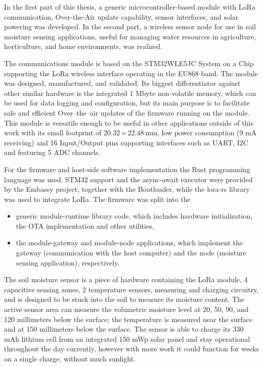 
In the first part of this thesis, a generic microcontroller-based module with LoRa communication, Over-the-Air update capability,  sensor interfaces, and solar powering was developed. In the second part, a wireless sensor node for use in soil moisture sensing applications, useful for managing water resources in agriculture, horticulture, and home environments, was realized.

The communications module is based on the STM32WLE5JC System on a Chip supporting the LoRa wireless interface operating in the EU868 band. The module was designed, manufactured, and validated. Its biggest differentiator against other similar hardware is the integrated 1 Mbyte non-volatile memory, which can be used for data logging and configuration, but its main purpose is to facilitate safe and efficient Over--the--air updates of the firmware running on the module. This module is versatile enough to be useful in other applications outside of this work with its small footprint of $20.32 \times 22.48~\mathrm{mm}$, low power consumption (9 mA receiving) and 16 Input/Output pins supporting interfaces such as UART, I2C and featuring 5 ADC channels.

For the firmware and host-side software implementation the Rust programming language was used. STM32 support and the async-await executor were provided by the Embassy project, together with the Bootloader, while the lora-rs library was used to integrate LoRa. The firmware was split into the 
\begin{itemize}
    \item generic module-runtime library code, which includes hardware initialization, the OTA implementation and other utilities,
    \item the module-gateway and module-node applications, which implement the gateway (communication with the host computer) and the node (moisture sensing application), respectively.
\end{itemize}

The soil moisture sensor is a piece of hardware containing the LoRa module, 4 capacitive sensing zones, 2 temperature sensors, measuring and charging circuitry, and is designed to be stuck into the soil to measure its moisture content. The active sensor area can measure the volumetric moisture level at 20, 50, 90, and 120 millimeters below the surface; the temperature is measured near the surface and at 150 millimeters below the surface. The sensor is able to charge its 330 mAh lithium cell from an integrated 150 mWp solar panel and stay operational throughout the day currently, however with more work it could function for weeks on a single charge, without much sunlight.

